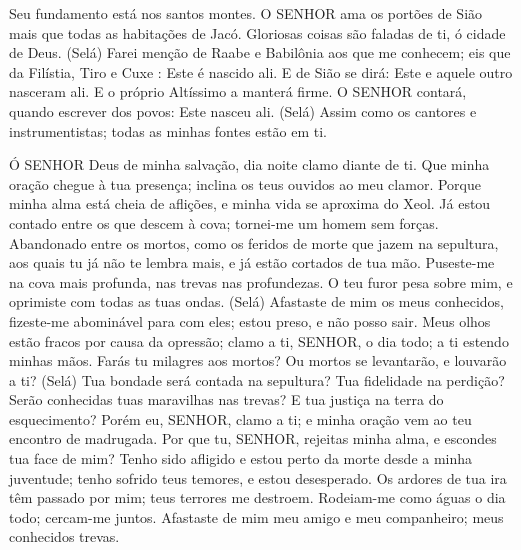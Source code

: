
{\PP 
  Seu fundamento está nos santos montes.
  O SENHOR ama os portões de Sião mais que todas as habitações de Jacó.
  Gloriosas coisas são faladas de ti, ó cidade de Deus. (Selá)
  Farei menção de Raabe e Babilônia aos que me conhecem;
 eis que da Filístia, Tiro e Cuxe
{} : Este é nascido ali.
  E de Sião se dirá: Este e aquele outro nasceram ali. E o próprio Altíssimo a manterá firme.
  O SENHOR contará, quando escrever dos povos: Este nasceu ali. (Selá)
  Assim como os cantores e instrumentistas; todas as minhas fontes estão em ti.
\par }


{\PP 
  Ó SENHOR Deus de minha salvação, dia
{} noite clamo diante de ti.
  Que minha oração chegue à tua presença; inclina os teus ouvidos ao meu clamor.
  Porque minha alma está cheia de aflições, e minha vida se aproxima do Xeol.
  Já estou contado entre os que descem à cova; tornei-me um homem sem forças.
  Abandonado entre os mortos, como os feridos de morte que jazem na sepultura, aos quais tu já não te lembra mais, e já estão cortados
{} de tua mão.
  Puseste-me na cova mais profunda, nas trevas
{} nas profundezas.
  O teu furor pesa sobre mim, e
{} oprimiste com todas as tuas ondas. (Selá)
  Afastaste de mim os meus conhecidos, fizeste-me abominável para com eles; estou preso, e não posso sair.
  Meus olhos estão fracos por causa da opressão; clamo a ti, SENHOR, o dia todo; a ti estendo minhas mãos.
  Farás tu milagres aos mortos? Ou mortos se levantarão, e louvarão a ti? (Selá)
  Tua bondade será contada na sepultura? Tua fidelidade na perdição?
  Serão conhecidas tuas maravilhas nas trevas? E tua justiça na terra do esquecimento?
  Porém eu, SENHOR, clamo a ti; e minha oração vem ao teu encontro de madrugada.
  Por que tu, SENHOR, rejeitas minha alma, e escondes tua face de mim?
  Tenho sido afligido e estou perto da morte desde a minha juventude; tenho sofrido teus temores, e estou desesperado.
  Os ardores de tua ira têm passado por mim; teus terrores me destroem.
  Rodeiam-me como águas o dia todo; cercam-me juntos.
  Afastaste de mim meu amigo e meu companheiro; meus conhecidos
{} trevas.
\par }


